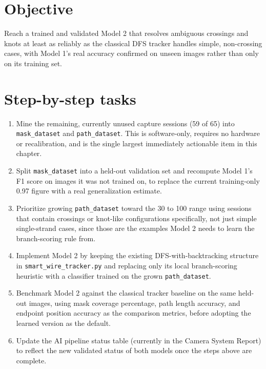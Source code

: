 \section{Objective}

Reach a trained and validated Model 2 that resolves ambiguous crossings and knots at least as reliably as the classical DFS tracker handles simple, non-crossing cases, with Model 1's real accuracy confirmed on unseen images rather than only on its training set.

\section{Step-by-step tasks}

\begin{enumerate}[leftmargin=*]
    \item Mine the remaining, currently unused capture sessions (59 of 65) into \texttt{mask\_dataset} and \texttt{path\_dataset}. This is software-only, requires no hardware or recalibration, and is the single largest immediately actionable item in this chapter.
    \item Split \texttt{mask\_dataset} into a held-out validation set and recompute Model 1's F1 score on images it was not trained on, to replace the current training-only 0.97 figure with a real generalization estimate.
    \item Prioritize growing \texttt{path\_dataset} toward the 30 to 100 range using sessions that contain crossings or knot-like configurations specifically, not just simple single-strand cases, since those are the examples Model 2 needs to learn the branch-scoring rule from.
    \item Implement Model 2 by keeping the existing DFS-with-backtracking structure in \texttt{smart\_wire\_tracker.py} and replacing only its local branch-scoring heuristic with a classifier trained on the grown \texttt{path\_dataset}.
    \item Benchmark Model 2 against the classical tracker baseline on the same held-out images, using mask coverage percentage, path length accuracy, and endpoint position accuracy as the comparison metrics, before adopting the learned version as the default.
    \item Update the AI pipeline status table (currently in the Camera System Report) to reflect the new validated status of both models once the steps above are complete.
\end{enumerate}
